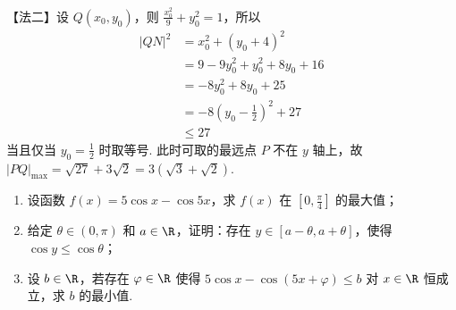 \documentclass[UTF8,a4paper,oneside,11pt]{ctexbook}
\begin{document}
\begin{solution}
\begin{enumerate}
\begin{enumerate}
【法二】设 \(Q(x_0,y_0)\)，则 \(\frac{x_0^2}{9}+y_0^2=1\)，所以
\begin{align*}
|QN|^2&=x_0^2+(y_0+4)^2\\
&=9-9y_0^2+y_0^2+8y_0+16\\
&=-8y_0^2+8y_0+25\\
&=-8\left(y_0-\frac{1}{2}\right)^2+27\\
&\le 27
\end{align*}
当且仅当 \(y_0=\frac{1}{2}\) 时取等号. 此时可取的最远点 \(P\) 不在 \(y\) 轴上，故 \(|PQ|_{\max}=\sqrt{27}+3\sqrt{2}=3(\sqrt{3}+\sqrt{2})\).
\end{enumerate}
\end{enumerate}
\end{solution}

\begin{problem}

\begin{enumerate}
\item 设函数 \(f(x) = 5\cos x - \cos 5x\)，求 \(f(x)\) 在 \(\left[0, \frac{\pi}{4}\right]\) 的最大值；
\item 给定 \(\theta \in (0,\pi)\) 和 \(a \in \R\)，证明：存在 \(y \in [a - \theta, a + \theta]\)，使得 \(\cos y \le \cos \theta\)；
\item 设 \(b \in \R\)，若存在 \(\varphi \in \R\) 使得 \(5\cos x - \cos (5x + \varphi) \le b\) 对 \(x \in \R\) 恒成立，求 \(b\) 的最小值.
\end{enumerate}
\end{problem}
\end{document}
